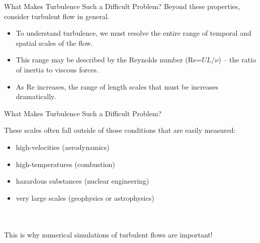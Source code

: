
\begin{frame}{What Makes Turbulence Such a Difficult Problem?}
  Beyond these properties, consider turbulent flow in general.
  \begin{itemize}
  \item To understand turbulence, we must resolve the entire range of temporal and spatial scales of the flow. 
  \item This range may be described by the Reynolds number (Re=$UL/\nu$) -- the ratio of inertia to viscous forces.  
  \item As Re increases, the range of length scales that must be increases dramatically.
  \end{itemize}
\end{frame}


\begin{frame}{What Makes Turbulence Such a Difficult Problem?}
  
  These scales often fall outside of those conditions that are easily measured:
  \begin{itemize}
  	\item high-velocities (aerodynamics)
  	\item high-temperatures (combustion)
  	\item hazardous substances (nuclear engineering)
  	\item very large scales (geophysics or astrophysics)
  \end{itemize}
  ~\\~\\
  This is why numerical simulations of turbulent flows are important!
  
  
\end{frame}





